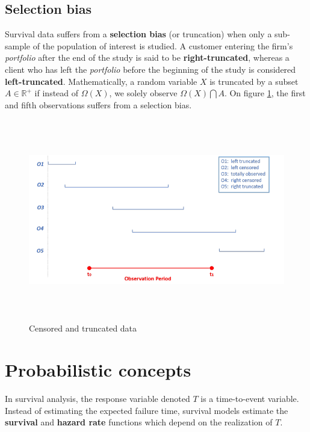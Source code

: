 \documentclass[
]{book}
\begin{document}
\hypertarget{selection-bias}{%
\subsection{Selection bias}\label{selection-bias}}

Survival data suffers from a \textbf{selection bias} (or truncation) when only a sub-sample of the population of interest is studied. A customer entering the firm's \emph{portfolio} after the end of the study is said to be \textbf{right-truncated}, whereas a client who has left the \emph{portfolio} before the beginning of the study is considered \textbf{left-truncated}. Mathematically, a random variable \(X\) is truncated by a subset \(A \in \mathbb{R}^+\) if instead of \(\Omega(X)\), we solely observe \(\Omega(X)\bigcap A\). On figure \ref{fig:censoring}, the first and fifth observations suffers from a selection bias.

\begin{figure}

{\centering \includegraphics[width=500pt,height=250pt]{./imgs/censoring_and_truncation} 

}

\caption{Censored and truncated data}\label{fig:censoring}
\end{figure}

\hypertarget{probabilistic-concepts}{%
\section{Probabilistic concepts}\label{probabilistic-concepts}}

In survival analysis, the response variable denoted \(T\) is a time-to-event variable. Instead of estimating the expected failure time, survival models estimate the \textbf{survival} and \textbf{hazard rate} functions which depend on the realization of \(T\).
\end{document}
